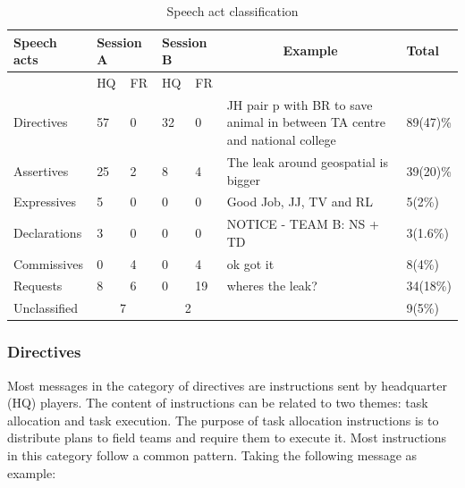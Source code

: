 \begin{table}[h]
\footnotesize
\begin{tabular}{lllllp{5cm}l}
Speech acts  & \multicolumn{2}{l}{Session A} & \multicolumn{2}{l}{Session B} & \multicolumn{1}{c}{Example} & Total    \\ \hline
             & HQ            & FR            & HQ            & FR            &                                                                            &          \\ \hline
Directives   & 57            & 0             & 32            & 0             & JH pair p with BR to save animal in between TA centre and national college & 89(47)\% \\
Assertives   & 25            & 2             & 8             & 4             &                                                                        The leak around geospatial is bigger & 39(20)\% \\
Expressives  & 5             & 0             & 0             & 0             &                                                                           Good Job, JJ, TV and RL & 5(2\%)   \\
Declarations & 3             & 0             & 0             & 0             &                                                                           NOTICE - TEAM B: NS + TD & 3(1.6\%) \\
Commissives  & 0             & 4             & 0             & 4             &                                                                           ok got it & 8(4\%)   \\
Requests     & 8             & 6             & 0             & 19            &                                                                           wheres the leak? & 34(18\%) \\
Unclassified & \multicolumn{2}{c}{7}         & \multicolumn{2}{c}{2}         &                                                                            & 9(5\%)  
\end{tabular}
\caption{Speech act classification}
\label{tab:speechact}
\end{table}

\subsubsection{Directives}

Most messages in the category of directives are instructions sent by headquarter (HQ) players. The content of instructions can be related to two themes: task allocation and task execution. The purpose of task allocation instructions is to distribute plans to field teams and require them to execute it. Most instructions in this category follow a common pattern. Taking the following message as example:\\

